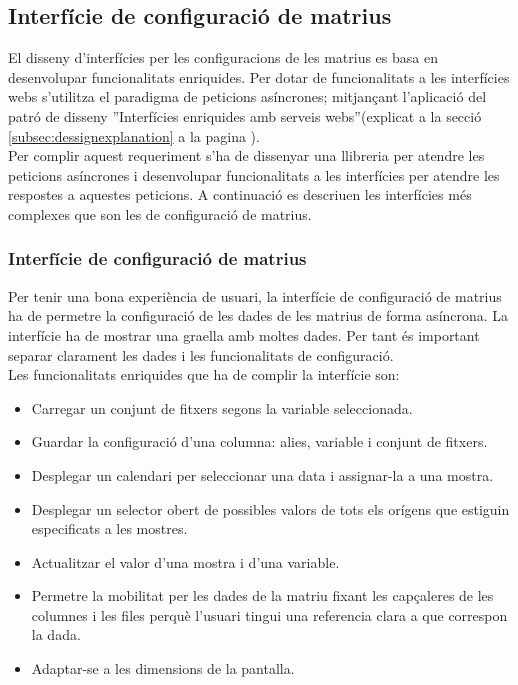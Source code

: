 \subsection{Interf\'{i}cie de configuraci\'{o} de matrius}
El disseny d'interfícies per les configuracions de les matrius es basa en desenvolupar funcionalitats enriquides\cite{ria}. Per dotar de funcionalitats a les interfícies webs s'utilitza el paradigma de peticions asíncrones;\cite{asyncronous} mitjançant l'aplicació del patró de disseny ''Interfícies enriquides amb serveis webs''(explicat a la secció \ref{subsec:dessignexplanation} a la pagina \pageref{ria}).\\ 

Per complir aquest requeriment s'ha de dissenyar una llibreria per atendre les peticions asíncrones i desenvolupar funcionalitats a les interfícies per atendre les respostes a aquestes peticions. A continuaci\'{o} es descriuen les interf\'{i}cies m\'{e}s complexes que son les de configuraci\'{o} de matrius.

\subsubsection{Interf\'{i}cie de configuraci\'{o} de matrius}
Per tenir una bona experiència de usuari, la interfície de configuració de matrius ha de permetre la configuració de les dades de les matrius de forma asíncrona. La interfície ha de mostrar una graella amb moltes dades. Per tant \'{e}s important separar clarament les dades i les funcionalitats de configuració.\\

Les funcionalitats enriquides que ha de complir la interfície son:
\begin{itemize}
\item Carregar un conjunt de fitxers segons la variable seleccionada.
\item Guardar la configuració d'una columna: alies, variable i conjunt de fitxers.
\item Desplegar un calendari per seleccionar una data i assignar-la a una mostra.
\item Desplegar un selector obert de possibles valors de tots els orígens que estiguin especificats a les mostres.
\item Actualitzar el valor d'una mostra i d'una variable.
\item Permetre la mobilitat per les dades de la matriu fixant les capçaleres de les columnes i les files perquè l'usuari tingui una referencia clara a que correspon la dada.
\item Adaptar-se a les dimensions de la pantalla.
\end{itemize}

